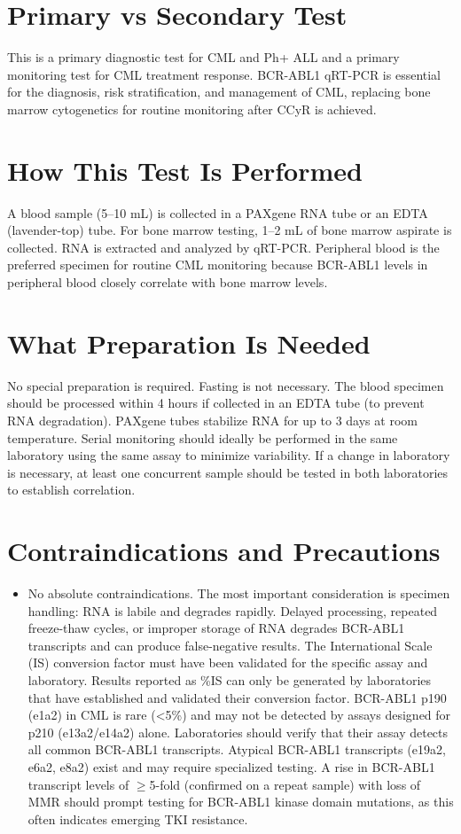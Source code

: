 \section*{Primary vs Secondary Test}
This is a primary diagnostic test for CML and Ph+ ALL and a primary monitoring test for CML treatment response. BCR-ABL1 qRT-PCR is essential for the diagnosis, risk stratification, and management of CML, replacing bone marrow cytogenetics for routine monitoring after CCyR is achieved.

\section*{How This Test Is Performed}
A blood sample (5--10 mL) is collected in a PAXgene RNA tube or an EDTA (lavender-top) tube. For bone marrow testing, 1--2 mL of bone marrow aspirate is collected. RNA is extracted and analyzed by qRT-PCR. Peripheral blood is the preferred specimen for routine CML monitoring because BCR-ABL1 levels in peripheral blood closely correlate with bone marrow levels.

\section*{What Preparation Is Needed}
No special preparation is required. Fasting is not necessary. The blood specimen should be processed within 4 hours if collected in an EDTA tube (to prevent RNA degradation). PAXgene tubes stabilize RNA for up to 3 days at room temperature. Serial monitoring should ideally be performed in the same laboratory using the same assay to minimize variability. If a change in laboratory is necessary, at least one concurrent sample should be tested in both laboratories to establish correlation.

\section*{Contraindications and Precautions}
\begin{itemize}
  \item No absolute contraindications. The most important consideration is specimen handling: RNA is labile and degrades rapidly. Delayed processing, repeated freeze-thaw cycles, or improper storage of RNA degrades BCR-ABL1 transcripts and can produce false-negative results. The International Scale (IS) conversion factor must have been validated for the specific assay and laboratory. Results reported as \%IS can only be generated by laboratories that have established and validated their conversion factor. BCR-ABL1 p190 (e1a2) in CML is rare (<5\%) and may not be detected by assays designed for p210 (e13a2/e14a2) alone. Laboratories should verify that their assay detects all common BCR-ABL1 transcripts. Atypical BCR-ABL1 transcripts (e19a2, e6a2, e8a2) exist and may require specialized testing. A rise in BCR-ABL1 transcript levels of $\geq$5-fold (confirmed on a repeat sample) with loss of MMR should prompt testing for BCR-ABL1 kinase domain mutations, as this often indicates emerging TKI resistance.
\end{itemize}
